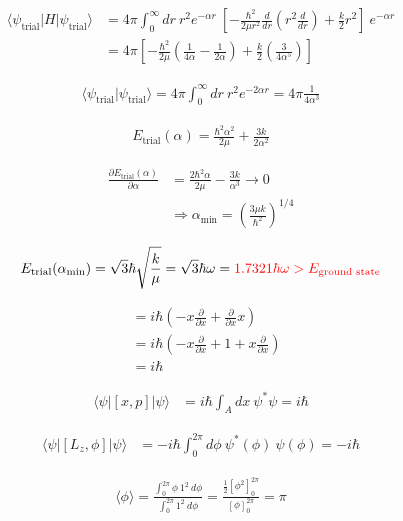 \documentclass[11pt,pra,aps]{revtex4}
\newcommand{\red}[1]{\textcolor{red}{#1}}
\begin{document}
\begin{align}
  \langle \psi_\text{trial}|H|\psi_\text{trial}\rangle &= 4\pi\int^{\infty}_{0} dr\ r^2 e^{-\alpha r}\ \left[-\frac{\hbar^2}{2\mu r^2}\frac{d}{dr}\left(r^2\frac{d}{dr}\right)+\frac{k}{2}r^2\right]\ e^{-\alpha r}\\
  &= 4\pi\left[ -\frac{\hbar^2}{2\mu}\left(\frac{1}{4\alpha}-\frac{1}{2\alpha}\right) + \frac{k}{2}\left(\frac{3}{4\alpha^5}\right)\right]
\end{align}

\begin{align}
  \langle \psi_\text{trial}|\psi_\text{trial}\rangle = 4\pi\int^{\infty}_{0} dr\ r^2 e^{-2\alpha r}=4\pi \frac{1}{4\alpha^3}
\end{align}

\begin{align}
  E_\text{trial}(\alpha)=\frac{\hbar^2\alpha^2}{2\mu}+\frac{3k}{2\alpha^2}
\end{align}

\begin{align}
  \frac{\partial E_\text{trial}(\alpha)}{\partial \alpha}&=\frac{2\hbar^2\alpha}{2\mu} - \frac{3k}{\alpha^3}\rightarrow 0 \\
  &\Rightarrow \alpha_\text{min} = \left(\frac{3 \mu k}{\hbar^2}\right)^{1/4}
\end{align}

\begin{align}
  E_\text{trial}(\alpha_\text{min})=\sqrt{3}\hbar\sqrt{\frac{k}{\mu}}={\sqrt{3}\hbar\omega}=\red{1.7321\hbar\omega>E_\text{ground state}}
\end{align}

\begin{align}
  [x,p]&=i\hbar\left(-x\frac{\partial}{\partial x}+\frac{\partial}{\partial x}x\right) \\
  &=i\hbar\left(-x\frac{\partial}{\partial x}+1+x\frac{\partial}{\partial x}\right) \\
  &=i\hbar
\end{align}

\begin{align}
  \langle\psi|[x,p]|\psi\rangle &= i\hbar\int_A dx\ \psi^{*}\psi = i\hbar
\end{align}

\begin{align}
  \langle\psi|[L_z,\phi]|\psi\rangle &= -i\hbar\int^{2\pi}_0 d\phi\ \psi^{*}(\phi)\ \psi(\phi) = -i\hbar
\end{align}

\begin{align}
  \langle\phi\rangle=\frac{\int^{2\pi}_0 \phi\ 1^2\ d\phi}{\int^{2\pi}_0 1^2\ d\phi}=\frac{\frac{1}{2}[\phi^2]^{2\pi}_0}{[\phi]^{2\pi}_0}=\pi
\end{align}
\end{document}
